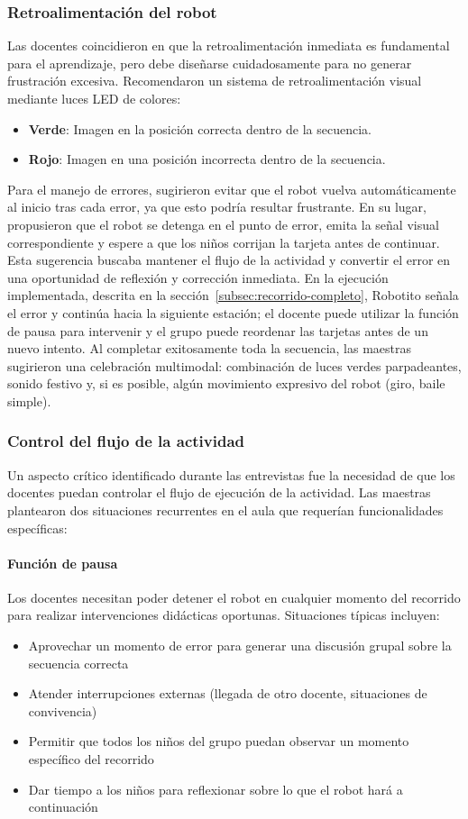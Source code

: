 \documentclass{prgrado}
\begin{document}
\subsubsection{Retroalimentación del robot}
Las docentes coincidieron en que la retroalimentación inmediata es fundamental para el aprendizaje, pero debe diseñarse cuidadosamente para no generar frustración excesiva. Recomendaron un sistema de retroalimentación visual mediante luces LED de colores:
\begin{itemize}
\item \textbf{Verde}: Imagen en la posición correcta dentro de la secuencia.
\item \textbf{Rojo}: Imagen en una posición incorrecta dentro de la secuencia.
\end{itemize}
Para el manejo de errores, sugirieron evitar que el robot vuelva automáticamente al inicio tras cada error, ya que esto podría resultar frustrante. En su lugar, propusieron que el robot se detenga en el punto de error, emita la señal visual correspondiente y espere a que los niños corrijan la tarjeta antes de continuar. Esta sugerencia buscaba mantener el flujo de la actividad y convertir el error en una oportunidad de reflexión y corrección inmediata. En la ejecución implementada, descrita en la sección~\ref{subsec:recorrido-completo}, Robotito señala el error y continúa hacia la siguiente estación; el docente puede utilizar la función de pausa para intervenir y el grupo puede reordenar las tarjetas antes de un nuevo intento.
Al completar exitosamente toda la secuencia, las maestras sugirieron una celebración multimodal: combinación de luces verdes parpadeantes, sonido festivo y, si es posible, algún movimiento expresivo del robot (giro, baile simple).
\subsubsection{Control del flujo de la actividad}
Un aspecto crítico identificado durante las entrevistas fue la necesidad de que los docentes puedan controlar el flujo de ejecución de la actividad. Las maestras plantearon dos situaciones recurrentes en el aula que requerían funcionalidades específicas:
\paragraph{Función de pausa} Los docentes necesitan poder detener el robot en cualquier momento del recorrido para realizar intervenciones didácticas oportunas. Situaciones típicas incluyen:
\begin{itemize}
\item Aprovechar un momento de error para generar una discusión grupal sobre la secuencia correcta
\item Atender interrupciones externas (llegada de otro docente, situaciones de convivencia)
\item Permitir que todos los niños del grupo puedan observar un momento específico del recorrido
\item Dar tiempo a los niños para reflexionar sobre lo que el robot hará a continuación
\end{itemize}
\end{document}
